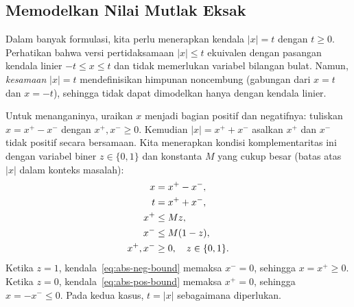 %
%
%

\subsection{Memodelkan Nilai Mutlak Eksak}
Dalam banyak formulasi, kita perlu menerapkan kendala $|x| = t$ dengan $t \geq 0$.
Perhatikan bahwa versi pertidaksamaan $|x| \leq t$ ekuivalen dengan pasangan kendala linier $-t \leq x \leq t$ dan tidak memerlukan variabel bilangan bulat.
Namun, \emph{kesamaan} $|x| = t$ mendefinisikan himpunan noncembung (gabungan dari $x = t$ dan $x = -t$), sehingga tidak dapat dimodelkan hanya dengan kendala linier.

Untuk menanganinya, uraikan $x$ menjadi bagian positif dan negatifnya: tuliskan $x = x^+ - x^-$ dengan $x^+, x^- \geq 0$.
Kemudian $|x| = x^+ + x^-$ asalkan $x^+$ dan $x^-$ tidak positif secara bersamaan.
Kita menerapkan kondisi komplementaritas ini dengan variabel biner $z \in \{0,1\}$ dan konstanta $M$ yang cukup besar (batas atas $|x|$ dalam konteks masalah):
\begin{align}
x &= x^+ - x^-, \notag\\
t &= x^+ + x^-, \notag\\
x^+ &\leq Mz, \label{eq:abs-pos-bound}\\
x^- &\leq M(1-z), \label{eq:abs-neg-bound}\\
x^+, x^- &\geq 0, \quad z \in \{0,1\}. \notag
\end{align}
Ketika $z=1$, kendala~\eqref{eq:abs-neg-bound} memaksa $x^- = 0$, sehingga $x = x^+ \geq 0$.
Ketika $z=0$, kendala~\eqref{eq:abs-pos-bound} memaksa $x^+ = 0$, sehingga $x = -x^- \leq 0$.
Pada kedua kasus, $t = |x|$ sebagaimana diperlukan.

